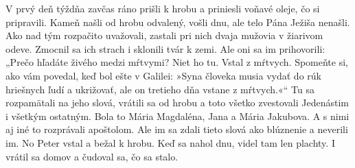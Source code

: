 V prvý deň týždňa zavčas ráno prišli k hrobu a priniesli voňavé oleje, čo si pripravili. Kameň našli od hrobu odvalený, vošli dnu, ale telo Pána Ježiša nenašli. 
\versseparator
Ako nad tým rozpačito uvažovali, zastali pri nich dvaja mužovia v žiarivom odeve. Zmocnil sa ich strach i sklonili tvár k zemi. Ale oni sa im prihovorili: „Prečo hľadáte živého medzi mŕtvymi? Niet ho tu. Vstal z mŕtvych. Spomeňte si, ako vám povedal, keď bol ešte v Galilei: »Syna človeka musia vydať do rúk hriešnych ľudí a ukrižovať, ale on tretieho dňa vstane z mŕtvych.«“ 
\versseparator
Tu sa rozpamätali na jeho slová, vrátili sa od hrobu a toto všetko zvestovali Jedenástim i všetkým ostatným. Bola to Mária Magdaléna, Jana a Mária Jakubova. A s nimi aj iné to rozprávali apoštolom. Ale im sa zdali tieto slová ako blúznenie a neverili im. 
\versseparator
No Peter vstal a bežal k hrobu. Keď sa nahol dnu, videl tam len plachty. I vrátil sa domov a čudoval sa, čo sa stalo.